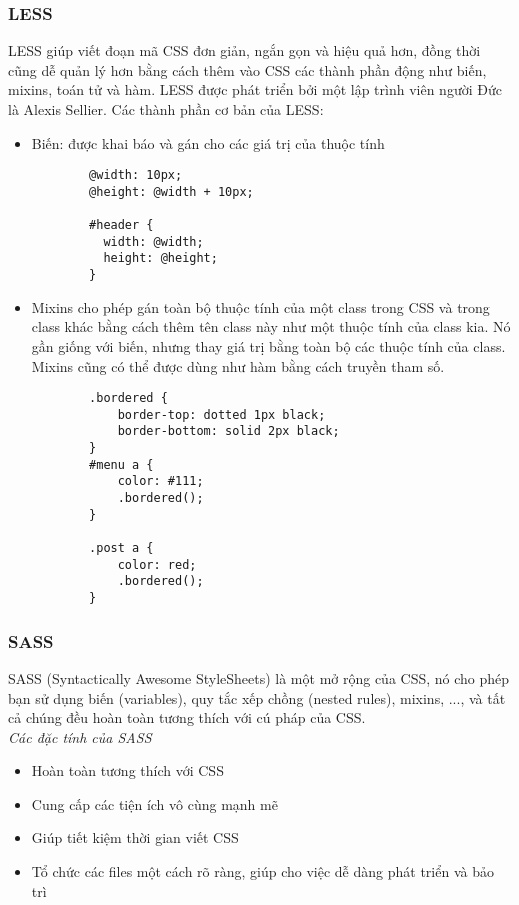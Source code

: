 \subsubsection{LESS}
LESS giúp viết đoạn mã CSS đơn giản, ngắn gọn và hiệu quả hơn, đồng thời cũng dễ quản lý hơn bằng cách thêm vào CSS các thành phần động như biến, mixins, toán tử và hàm. LESS được phát triển bởi một lập trình viên người Đức là Alexis Sellier. Các thành phần cơ bản của LESS:
\begin{itemize}
    \item Biến: được khai báo và gán cho các giá trị của thuộc tính
    \begin{verbatim}
        @width: 10px;
        @height: @width + 10px;

        #header {
          width: @width;
          height: @height;
        }
    \end{verbatim}
    \item Mixins cho phép gán toàn bộ thuộc tính của một class trong CSS và trong class khác bằng cách thêm tên class này như một thuộc tính của class kia. Nó gần giống với biến, nhưng thay giá trị bằng toàn bộ các thuộc tính của class. Mixins cũng có thể được dùng như hàm bằng cách truyền tham số.
    \begin{verbatim}
        .bordered {
            border-top: dotted 1px black;
            border-bottom: solid 2px black;
        }
        #menu a {
            color: #111;
            .bordered();
        }
        
        .post a {
            color: red;
            .bordered();
        }
    \end{verbatim}
\end{itemize}
\subsubsection{SASS}
SASS (Syntactically Awesome StyleSheets) là một mở rộng của CSS, nó cho phép bạn sử dụng biến (variables), quy tắc xếp chồng (nested rules), mixins, ..., và tất cả chúng đều hoàn toàn tương thích với cú pháp của CSS.\\

\textit{Các đặc tính của SASS}
\begin{itemize}
    \item Hoàn toàn tương thích với CSS
    \item Cung cấp các tiện ích vô cùng mạnh mẽ
    \item Giúp tiết kiệm thời gian viết CSS
    \item Tổ chức các files một cách rõ ràng, giúp cho việc dễ dàng phát triển và bảo trì
\end{itemize}

